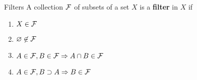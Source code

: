 \documentclass[a4paper, 10pt]{article}
\begin{document}
\begin{definition} {Filters}
A collection $\mathcal{F}$ of subsets of a set $X$ is a \textbf{filter} in $X$ if \begin{enumerate}
\item $X \in \mathcal{F}$
\item $\varnothing \not \in \mathcal{F}$
\item $A \in \mathcal{F}, B \in \mathcal{F} \Rightarrow A \cap B \in \mathcal{F}$
\item $A \in \mathcal{F}, B \supset A \Rightarrow B \in \mathcal{F}$
\end{enumerate}
\end{definition}
\end{document}
